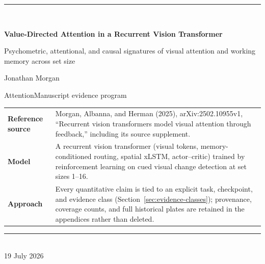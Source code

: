 \documentclass[11pt,a4paper]{article}
\begin{document}
\begin{titlepage}
\thispagestyle{empty}
\vspace*{18mm}
{\color{VdaBlue}\rule{\textwidth}{2.2pt}}\\[10mm]
{\fontsize{26}{31}\selectfont\bfseries Value-Directed Attention in a Recurrent Vision Transformer\par}
\vspace{5mm}
{\fontsize{15}{19}\selectfont Psychometric, attentional, and causal signatures of visual attention and working memory across set size\par}
\vspace{16mm}
{\large Jonathan Morgan\par}
\vspace{2mm}
{\normalsize AttentionManuscript evidence program\par}
\vfill
\begin{tabularx}{\textwidth}{@{}lY@{}}
\toprule
\textbf{Reference source} & Morgan, Albanna, and Herman (2025), arXiv:2502.10955v1, ``Recurrent vision transformers model visual attention through feedback,'' including its source supplement.\\
\textbf{Model} & A recurrent vision transformer (visual tokens, memory-conditioned routing, spatial xLSTM, actor--critic) trained by reinforcement learning on cued visual change detection at set sizes 1--16.\\
\textbf{Approach} & Every quantitative claim is tied to an explicit task, checkpoint, and evidence class (Section~\ref{sec:evidence-classes}); provenance, coverage counts, and full historical plates are retained in the appendices rather than deleted.\\
\bottomrule
\end{tabularx}
\vfill
{\color{VdaBlue}\rule{\textwidth}{2.2pt}}\\[3mm]
{\small 19 July 2026}
\end{titlepage}
\end{document}

